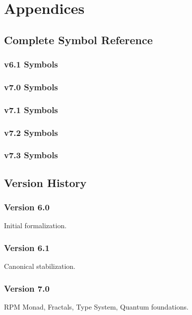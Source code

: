 \documentclass[11pt,twoside,openright]{book}
\theoremstyle{definition}
\theoremstyle{plain}
\theoremstyle{remark}
\begin{document}
\part{Appendices}
\label{part:appendices}

\chapter{Complete Symbol Reference}
\label{ch:symbol-reference}

\section{v6.1 Symbols}

\section{v7.0 Symbols}

\section{v7.1 Symbols}

\section{v7.2 Symbols}

\section{v7.3 Symbols}

\chapter{Version History}
\label{ch:version-history}

\section{Version 6.0}
Initial formalization.

\section{Version 6.1}
Canonical stabilization.

\section{Version 7.0}
RPM Monad, Fractals, Type System, Quantum foundations.
\end{document}
